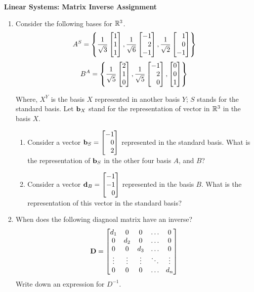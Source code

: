 \documentclass[9pt]{article}
\def\mf{\ensuremath\mathbf}
\def\mb{\ensuremath\mathbb}
\def\lc{\ensuremath\left\{}
\def\rc{\ensuremath\right\}}
\def\bmx{\ensuremath\begin{bmatrix*}[r]}
\def\emx{\ensuremath\end{bmatrix*}}
\begin{document}
\begin{center}
\begin{Large}
\textbf{Linear Systems: Matrix Inverse Assignment}
\end{Large}
\end{center}
\vspace{0.2cm}

\begin{multicols}{2}

\begin{enumerate}[resume]
    \item Consider the following bases for $\mb{R}^3$.
    \[ A^S = \lc \frac{1}{\sqrt{3}}\bmx1 \\ 1 \\ 1\emx, \frac{1}{\sqrt{6}}\bmx-1 \\ 2 \\ -1\emx, \frac{1}{\sqrt{2}}\bmx1 \\ 0 \\ -1\emx \rc \]
    \[ B^A = \lc \frac{1}{\sqrt{5}}\bmx2 \\ 1 \\ 0\emx, \frac{1}{\sqrt{5}}\bmx-1 \\ 2 \\ 0\emx, \bmx0 \\ 0 \\ 1\emx \rc \]

    Where,  $X^Y$ is the basis $X$ represented in another basis $Y$; $S$ stands for the standard basis. Let $\mf{b}_X$ stand for the representation of vector in $\mb{R}^3$ in the basis $X$. 
    \begin{enumerate}
        \item Consider a vector $\mf{b}_S = \bmx-1\\0\\2\emx$ represented in the standard basis. What is the representation of $\mf{b}_S$ in the other four basis $A$, and $B$?

        \item Consider a vector $\mf{d}_B = \bmx-1\\-1\\0\emx$ represented in the basis $B$. What is the representation of this vector in the standard basis?
    \end{enumerate}


    \item When does the following diagnoal matrix have an inverse?
    \[ \mf{D} = \begin{bmatrix*}
    d_1 & 0 & 0 & \ldots & 0\\
    0 & d_2 & 0 & \ldots & 0\\
    0 & 0 & d_3 & \ldots & 0\\
    \vdots & \vdots & \vdots & \ddots & \vdots\\
    0 & 0 & 0 & \ldots & d_n\\\end{bmatrix*} \]
    Write down an expression for $D^{-1}$.
    

\end{enumerate}
\end{multicols}
\end{document}
